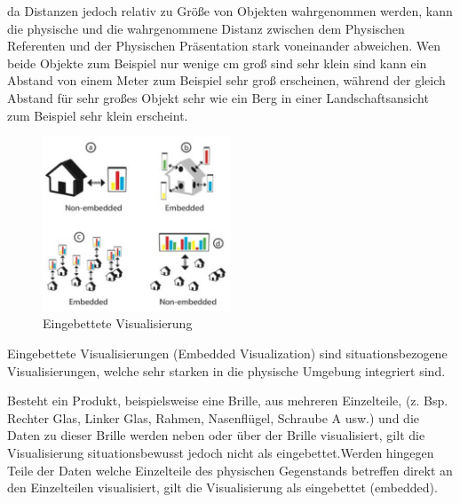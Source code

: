 \cite[p.~194]{ElSayedNevenA.M.BruceH.ThomasRossT.Smith2015}  da Distanzen jedoch relativ zu Größe von Objekten wahrgenommen werden, kann die physische und die wahrgenommene Distanz zwischen dem Physischen Referenten und der Physischen Präsentation stark voneinander abweichen. Wen beide Objekte zum Beispiel nur wenige cm groß sind sehr klein sind kann ein Abstand von einem Meter zum Beispiel sehr groß erscheinen, während der gleich Abstand für sehr großes Objekt sehr wie  ein Berg in einer Landschaftsansicht zum Beispiel sehr klein erscheint. 

\begin{figure}[H]
	\centering
	\includegraphics[width=0.5\textwidth]{resources/fundamentals/situated_visualization/embedded_visualization.png}
	\caption{Eingebettete Visualisierung \cite{example_embedded_visualization_concept}}
	\label{img:embedded_visualization}
\end{figure}

\cite[p.~195]{ElSayedNevenA.M.BruceH.ThomasRossT.Smith2015} Eingebettete Visualisierungen (Embedded Visualization) sind situationsbezogene Visualisierungen, welche sehr starken in die physische Umgebung integriert sind. 

Besteht ein Produkt, beispielsweise eine Brille, aus mehreren Einzelteile, (z. Bsp. Rechter Glas, Linker Glas, Rahmen, Nasenflügel, Schraube A usw.) und die Daten zu dieser Brille werden neben oder über der Brille visualisiert, gilt die Visualisierung situationsbewusst jedoch nicht als eingebettet.Werden hingegen Teile der Daten welche Einzelteile des physischen Gegenstands betreffen direkt an den Einzelteilen visualisiert, gilt die Visualisierung als eingebettet (embedded).

